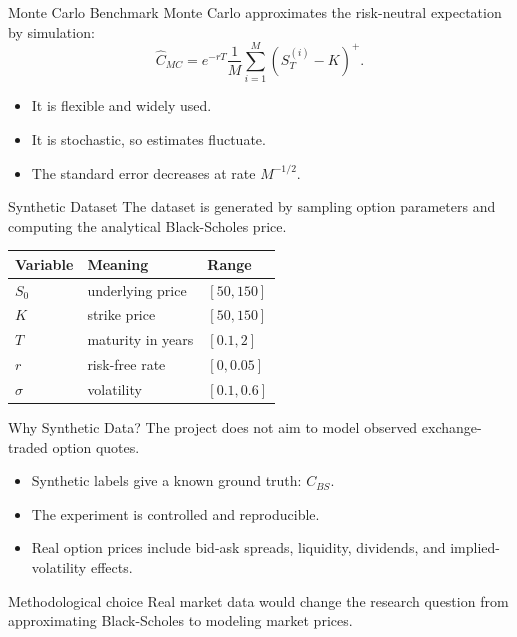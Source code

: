 \documentclass[10pt,aspectratio=43]{beamer}
\begin{document}
\begin{frame}{Monte Carlo Benchmark}
    Monte Carlo approximates the risk-neutral expectation by simulation:
    \[
        \widehat{C}_{MC}
        =
        e^{-rT}\frac{1}{M}
        \sum_{i=1}^{M}
        (S_T^{(i)}-K)^+.
    \]

    \begin{itemize}
        \item It is flexible and widely used.
        \item It is stochastic, so estimates fluctuate.
        \item The standard error decreases at rate \(M^{-1/2}\).
    \end{itemize}
\end{frame}


\begin{frame}{Synthetic Dataset}
    The dataset is generated by sampling option parameters and computing the analytical Black-Scholes price.

    \begin{center}
        \small
        \begin{tabular}{lll}
            \toprule
            Variable   & Meaning           & Range         \\
            \midrule
            \(S_0\)    & underlying price  & \([50,150]\)  \\
            \(K\)      & strike price      & \([50,150]\)  \\
            \(T\)      & maturity in years & \([0.1,2]\)   \\
            \(r\)      & risk-free rate    & \([0,0.05]\)  \\
            \(\sigma\) & volatility        & \([0.1,0.6]\) \\
            \bottomrule
        \end{tabular}
    \end{center}
\end{frame}

\begin{frame}{Why Synthetic Data?}
    The project does not aim to model observed exchange-traded option quotes.

    \begin{itemize}
        \item Synthetic labels give a known ground truth: \(C_{BS}\).
        \item The experiment is controlled and reproducible.
        \item Real option prices include bid-ask spreads, liquidity, dividends, and implied-volatility effects.
    \end{itemize}

    \begin{block}{Methodological choice}
        Real market data would change the research question from approximating Black-Scholes to modeling market prices.
    \end{block}
\end{frame}
\end{document}

